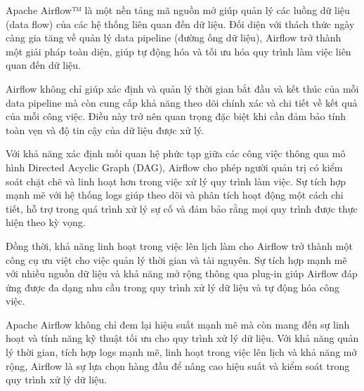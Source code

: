 
Apache Airflow™ là một nền tảng mã nguồn mở giúp quản lý các luồng dữ liệu (data flow) của các hệ thống liên quan đến dữ liệu. Đối diện với thách thức ngày càng gia tăng về quản lý data pipeline (đường ống dữ liệu), Airflow trở thành một giải pháp toàn diện, giúp tự động hóa và tối ưu hóa quy trình làm việc liên quan đến dữ liệu.\cite{airflow}

Airflow không chỉ giúp xác định và quản lý thời gian bắt đầu và kết thúc của mỗi data pipeline mà còn cung cấp khả năng theo dõi chính xác và chi tiết về kết quả của mỗi công việc. Điều này trở nên quan trọng đặc biệt khi cần đảm bảo tính toàn vẹn và độ tin cậy của dữ liệu được xử lý.

Với khả năng xác định mối quan hệ phức tạp giữa các công việc thông qua mô hình Directed Acyclic Graph (DAG), Airflow cho phép người quản trị có kiểm soát chặt chẽ và linh hoạt hơn trong việc xử lý quy trình làm việc. Sự tích hợp mạnh mẽ với hệ thống logs giúp theo dõi và phân tích hoạt động một cách chi tiết, hỗ trợ trong quá trình xử lý sự cố và đảm bảo rằng mọi quy trình được thực hiện theo kỳ vọng.

Đồng thời, khả năng linh hoạt trong việc lên lịch làm cho Airflow trở thành một công cụ ưu việt cho việc quản lý thời gian và tài nguyên. Sự tích hợp mạnh mẽ với nhiều nguồn dữ liệu và khả năng mở rộng thông qua plug-in giúp Airflow đáp ứng được đa dạng nhu cầu trong quy trình xử lý dữ liệu và tự động hóa công việc.

Apache Airflow không chỉ đem lại hiệu suất mạnh mẽ mà còn mang đến sự linh hoạt và tính năng kỹ thuật tối ưu cho quy trình xử lý dữ liệu. Với khả năng quản lý thời gian, tích hợp logs mạnh mẽ, linh hoạt trong việc lên lịch và khả năng mở rộng, Airflow là sự lựa chọn hàng đầu để nâng cao hiệu suất và kiểm soát trong quy trình xử lý dữ liệu.



